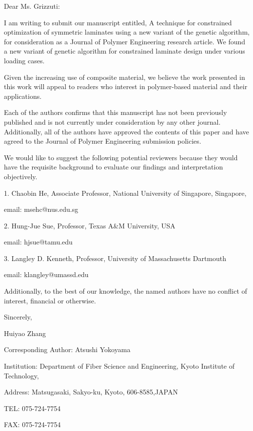 \documentclass{article}
\begin{document}
Dear Ms. Grizzuti:

\vskip 0.1in
I am writing to submit our manuscript entitled, A technique for constrained optimization of
symmetric laminates using a new variant of the genetic algorithm, for consideration as a Journal of
Polymer Engineering research article. We found a new variant of genetic algorithm for constrained
laminate design under various loading cases.


\vskip 0.1in
Given the increasing use of composite material, we believe the work presented in this work will
appeal to readers who interest in polymer-based material and their applications. 

\vskip 0.1in

Each of the authors confirms that this manuscript has not been previously published and is not
currently under consideration by any other journal. Additionally, all of the authors have approved
the contents of this paper and have agreed to the Journal of Polymer Engineering  submission
policies.

\vskip 0.1in

We would like to suggest the following potential
reviewers because they would have the requisite background to evaluate our findings and
interpretation objectively.

\vskip 0.05in
1.  Chaobin He, Associate Professor, National University of Singapore, Singapore,

	email: msehc@nus.edu.sg 

\vskip 0.02in
2.  Hung-Jue Sue, Professor,  Texas A\&M University, USA 

	email: hjsue@tamu.edu 
\vskip 0.02in

3.  Langley D. Kenneth,  Professor, University of Massachusetts Dartmouth 

	email: klangley@umassd.edu
\vskip 0.05in


Additionally, to the best of our knowledge, the named authors have no conflict of
interest, financial or otherwise.

\vskip 0.15in

Sincerely,

Huiyao Zhang

\vskip 0.2in
Corresponding Author: Atsushi Yokoyama

Institution: Department of Fiber Science and Engineering, Kyoto Institute of Technology,

Address:   Matsugasaki, Sakyo-ku, Kyoto, 606-8585,JAPAN

TEL: 075-724-7754  

FAX:  075-724-7754


 
\end{document}
